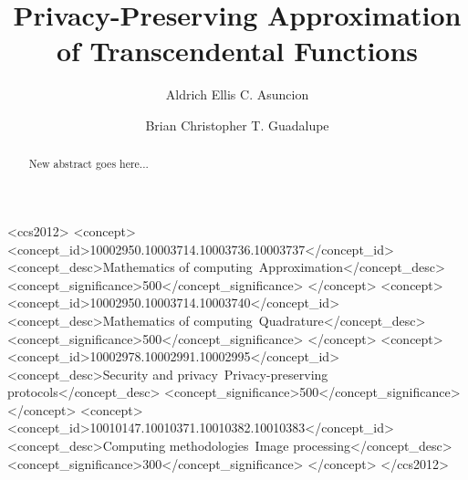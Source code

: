 \documentclass[sigconf]{acmart}
\begin{document}
\title{Privacy-Preserving Approximation of Transcendental Functions}

\author{Aldrich Ellis C. Asuncion}

\author{Brian Christopher T. Guadalupe}


\begin{abstract}
New abstract goes here...
\end{abstract}

%
%
\begin{CCSXML}
  <ccs2012>
  <concept>
  <concept_id>10002950.10003714.10003736.10003737</concept_id>
  <concept_desc>Mathematics of computing~Approximation</concept_desc>
  <concept_significance>500</concept_significance>
  </concept>
  <concept>
  <concept_id>10002950.10003714.10003740</concept_id>
  <concept_desc>Mathematics of computing~Quadrature</concept_desc>
  <concept_significance>500</concept_significance>
  </concept>
  <concept>
  <concept_id>10002978.10002991.10002995</concept_id>
  <concept_desc>Security and privacy~Privacy-preserving protocols</concept_desc>
  <concept_significance>500</concept_significance>
  </concept>
  <concept>
  <concept_id>10010147.10010371.10010382.10010383</concept_id>
  <concept_desc>Computing methodologies~Image processing</concept_desc>
  <concept_significance>300</concept_significance>
  </concept>
  </ccs2012>
\end{CCSXML}
\end{document}
